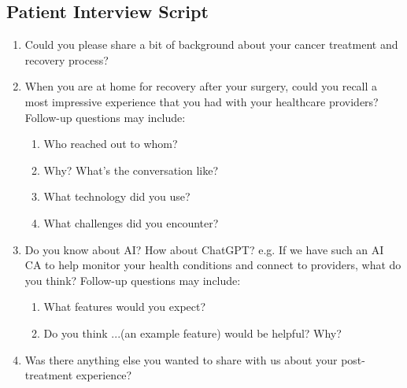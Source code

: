 \subsection{Patient Interview Script}
\label{8-appendix-patient-interview-script}
\begin{enumerate}
    \item Could you please share a bit of background about your cancer treatment and recovery process? 

    \item When you are at home for recovery after your surgery, could you recall a most impressive experience that you had with your healthcare providers? Follow-up questions may include:
    \begin{enumerate}
        \item Who reached out to whom?
        \item Why? What’s the conversation like?
        \item What technology did you use?
        \item What challenges did you encounter?
    \end{enumerate}

\item Do you know about AI? How about ChatGPT?
 e.g. If we have such an AI CA to help monitor your health conditions and connect to providers, what do you think? Follow-up questions may include:
 \begin{enumerate}
     \item What features would you expect?
     \item Do you think ...(an example feature) would be helpful? Why?
 \end{enumerate}
\item Was there anything else you wanted to share with us about your post-treatment experience? 
\end{enumerate}

